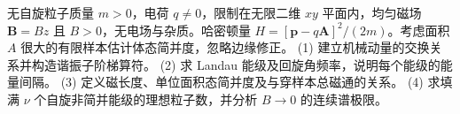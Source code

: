 无自旋粒子质量 \(m>0\)，电荷 \(q\ne0\)，限制在无限二维 \(xy\) 平面内，均匀磁场 \(\mathbf B=B\hat z\) 且 \(B>0\)，无电场与杂质。哈密顿量 \(H=[\mathbf p-q\mathbf A]^2/(2m)\)。考虑面积 \(A\) 很大的有限样本估计体态简并度，忽略边缘修正。
(1) 建立机械动量的交换关系并构造谐振子阶梯算符。
(2) 求 Landau 能级及回旋角频率，说明每个能级的能量间隔。
(3) 定义磁长度、单位面积态简并度及与穿样本总磁通的关系。
(4) 求填满 \(\nu\) 个自旋非简并能级的理想粒子数，并分析 \(B\to0\) 的连续谱极限。
